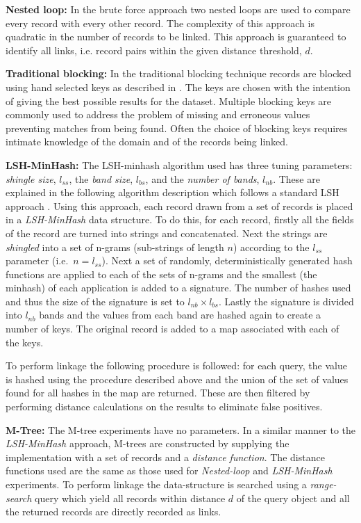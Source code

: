 \documentclass{llncs}
\begin{document}
\smallskip
\textbf{Nested loop:}
In the brute force approach two nested loops are used to compare every 
record with every other record. The complexity of this 
approach is quadratic in the number of records to
be linked. This approach is guaranteed to identify all links, i.e. record pairs within the given distance threshold, $d$.

\smallskip
\textbf{Traditional  blocking:}
In the traditional blocking technique records are blocked using hand selected keys as described in \cite{Chr12b}. The keys are chosen with the intention of giving the best possible results for the dataset. Multiple blocking keys are commonly used to address the problem of missing and erroneous values preventing matches from being found. Often the choice of blocking keys requires intimate knowledge of the domain and of the records being linked.

\smallskip
\textbf{LSH-MinHash:}
The LSH-minhash algorithm used has three tuning parameters:
\emph{shingle size}, $l_{ss}$, the \emph{band size}, $l_{bs}$, and the
\emph{number of bands}, $l_{nb}$.
These are explained in the following algorithm description which follows a standard LSH approach \cite{Ind98}.
Using this approach, each record drawn from a set of records is placed in a \emph{LSH-MinHash} data structure.
To do this, for each record, firstly all the fields of the record are turned into strings and 
concatenated. Next the strings are \emph{shingled} into a set of
n-grams (sub-strings of length $n$) according to the $l_{ss}$
parameter (i.e.\ $n = l_{ss}$). Next a set of randomly, 
deterministically generated hash functions are applied to each of the
sets of n-grams and the smallest (the minhash) of each application is
added to a signature. The number of hashes used and thus the size of
the signature is set to $l_{nb} \times l_{bs}$.
Lastly the signature is divided into $l_{nb}$ bands and the values  from each band are hashed again to create a number of keys.
The original record is added to a map associated with each of the keys. 

To perform linkage the following procedure is followed: for each query, the value is hashed using the procedure described above and the union of the set of values found for all hashes in the map are returned. These are then filtered by performing distance calculations on the results to eliminate false positives.

\smallskip 
\textbf{M-Tree:} The M-tree experiments have no parameters. In a similar manner to the \emph{LSH-MinHash} approach, M-trees are constructed by supplying the implementation with a set of records and a \emph{distance function}. The distance functions used are the same as those used for \emph{Nested-loop} and \emph{LSH-MinHash} experiments. To perform linkage the data-structure is searched using a \emph{range-search} query which yield all records within distance $d$ of the query object and all the returned records are directly recorded as links.
\end{document}

